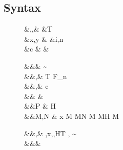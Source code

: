 \documentclass[manuscript,screen,nonacm]{acmart}
\begin{document}
\subsection{Syntax}
\begin{figure}[ht]
  \centering
  \begin{syntax}
     &\TyVar,\beta,\Co  &\qquad{} &T \\
     &x,y                  &\qquad{}        &i,n \in {} \\
     &c & &
  \end{syntax}
  \begin{syntax}
         &&\kappa       \bnfeq& \star \bnfor \kappa \to \kappa \bnfor \sigma \sim \tau\\
         &&\tau,\sigma  \bnfeq& \TyVar \bnfor T \bnfor \tau \to \tau \bnfor \tau\App\tau \bnfor \Forall {\TyVar\co\kappa} \tau \bnfor F_n\\
     &&\nu,\Co      \bnfeq& c \bnfor {}\tau \bnfor \Sym\Co \bnfor \trans\nu\Co %
                                        \bnfor \Forall {\TyVar\co\kappa} \Co \bnfor \Co\At\tau %
                                        \bnfor \nu\App\Co \bnfor \Left \Co \bnfor \Right \Co\\  %
     && \phi \bnfeq& \tau \bnfor \Co\\
      &&P    \bnfeq& H\App \many{\TyVar\co\kappa} \\
         &&M,N  \bnfeq& x \bnfor  {} M \bnfor M\App N \bnfor \TLam{\tau\co\kappa} M \bnfor M\App \tau \bnfor H \bnfor \Case M  \bnfor \Cast \Tm \Co\\

    \end{syntax}
    \begin{syntax}
     &&\TEnv,\Delta \bnfeq& \empt \bnfor \TEnv,x\co\tau \bnfor \TEnv,\TyVar\co\kappa \bnfor \TEnv,H\co T \bnfor \TEnv, \Co \co \tau\sim\sigma\\
      &&\Subst       \bnfeq& \empt \bnfor \Set{\many{\TyVar \mapsto \tau}}
  \end{syntax}


\end{figure}
\end{document}
